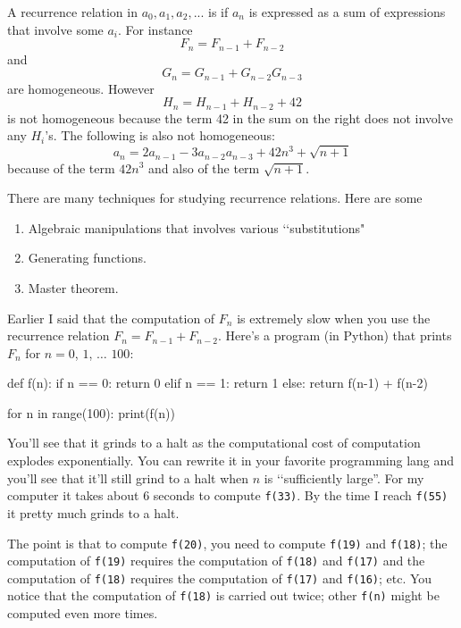 A recurrence relation in $a_0, a_1, a_2, ...$ is  if
$a_n$ is expressed as a sum of expressions that involve some $a_i$.
For instance
\[
F_{n} = F_{n - 1} + F_{n - 2}
\]
and
\[
G_{n} = G_{n - 1} + G_{n - 2}G_{n-3}
\]
are homogeneous.
However
\[
H_{n} = H_{n - 1} + H_{n - 2} + 42
\]
is not homogeneous because the term 42 in the sum on the right does not involve
any $H_i$'s.
The following is also not homogeneous:
\[
a_n = 2 a_{n-1} - 3a_{n-2}a_{n-3} + 42n^3 + \sqrt{n + 1}
\]
because of the term $42n^3$ and also of the term $\sqrt{n + 1}$. 

There are many techniques for studying recurrence relations.
Here are some
\begin{enumerate}[nosep]
  \item Algebraic manipulations that involves various \lq\lq substitutions"
  \item Generating functions.
  \item Master theorem. 
\end{enumerate}

Earlier I said that the computation of $F_n$ is extremely slow
when you use the recurrence relation $F_n = F_{n-1} + F_{n-2}$.
Here's a program (in Python) 
that prints $F_n$ for $n=0$, $1$, $\ldots$ $100$:
\begin{console}[fontsize=\footnotesize]
def f(n):
    if n == 0: return 0
    elif n == 1: return 1
    else: return f(n-1) + f(n-2)

for n in range(100):
    print(f(n))
\end{console}
You'll see that it grinds to a halt as the computational
cost of computation explodes exponentially.
You can rewrite it in your favorite programming lang and you'll see that
it'll still grind to a halt when $n$ is \lq\lq sufficiently large''.
For my computer
it takes about 6 seconds to compute \verb!f(33)!.
By the time I reach \verb!f(55)! it pretty much grinds to a halt.

The point is that to compute \verb!f(20)!,
you need to compute \verb!f(19)! and \verb!f(18)!;
the computation of \verb!f(19)! requires the computation of 
\verb!f(18)! and \verb!f(17)! and the
computation of \verb!f(18)! requires the computation of 
\verb!f(17)! and \verb!f(16)!; etc.
You notice that the computation of \verb!f(18)! is carried out twice;
other \verb!f(n)! might be computed even more times.

